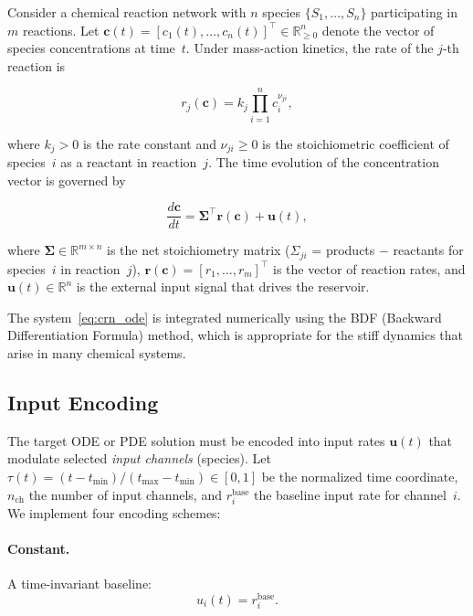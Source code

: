 \documentclass[11pt,twocolumn]{article}
\newcommand{\R}{\mathbb{R}}
\newcommand{\bu}{\mathbf{u}}
\newcommand{\bc}{\mathbf{c}}
\begin{document}
Consider a chemical reaction network with $n$ species
$\{S_1, \ldots, S_n\}$ participating in $m$ reactions.  Let
$\bc(t) = [c_1(t), \ldots, c_n(t)]^\top \in \R^n_{\geq 0}$ denote the
vector of species concentrations at time~$t$.  Under mass-action kinetics,
the rate of the $j$-th reaction is

\begin{equation}
  r_j(\bc) = k_j \prod_{i=1}^{n} c_i^{\nu_{ji}},
  \label{eq:mass_action}
\end{equation}

where $k_j > 0$ is the rate constant and $\nu_{ji} \geq 0$ is the
stoichiometric coefficient of species~$i$ as a reactant in reaction~$j$.
The time evolution of the concentration vector is governed by

\begin{equation}
  \frac{d\bc}{dt} = \boldsymbol{\Sigma}^\top \mathbf{r}(\bc) + \bu(t),
  \label{eq:crn_ode}
\end{equation}

where $\boldsymbol{\Sigma} \in \R^{m \times n}$ is the net stoichiometry
matrix ($\Sigma_{ji}$ = products $-$ reactants for species~$i$ in
reaction~$j$), $\mathbf{r}(\bc) = [r_1, \ldots, r_m]^\top$ is the vector of
reaction rates, and $\bu(t) \in \R^n$ is the external input signal that
drives the reservoir.

The system~\eqref{eq:crn_ode} is integrated numerically using the BDF
(Backward Differentiation Formula) method, which is appropriate for the stiff
dynamics that arise in many chemical systems.

\subsection{Input Encoding}
\label{sec:encoding}

The target ODE or PDE solution must be encoded into input rates $\bu(t)$
that modulate selected \emph{input channels} (species).  Let
$\tau(t) = (t - t_{\min})/(t_{\max} - t_{\min}) \in [0,1]$ be the normalized
time coordinate, $n_\text{ch}$ the number of input channels, and
$r_i^\text{base}$ the baseline input rate for channel~$i$.  We implement four
encoding schemes:

\paragraph{Constant.}
A time-invariant baseline:
\begin{equation}
  u_i(t) = r_i^\text{base}.
\end{equation}
\end{document}
